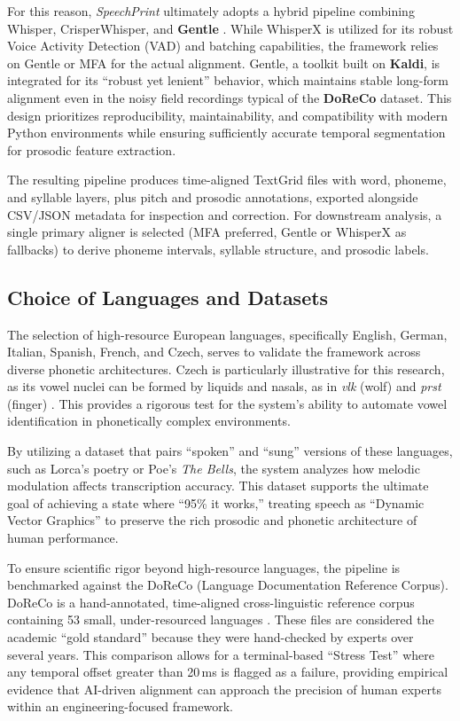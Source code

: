 For this reason, \textit{SpeechPrint} ultimately adopts a hybrid pipeline combining Whisper, CrisperWhisper, and \textbf{Gentle} \cite{ochshorn2015gentle}. While WhisperX is utilized for its robust Voice Activity Detection (VAD) and batching capabilities, the framework relies on Gentle or MFA for the actual alignment. Gentle, a toolkit built on \textbf{Kaldi}, is integrated for its ``robust yet lenient'' behavior, which maintains stable long-form alignment even in the noisy field recordings typical of the \textbf{DoReCo} dataset. This design prioritizes reproducibility, maintainability, and compatibility with modern Python environments while ensuring sufficiently accurate temporal segmentation for prosodic feature extraction.

The resulting pipeline produces time-aligned TextGrid files with word, phoneme, and syllable layers, plus pitch and prosodic annotations, exported alongside CSV/JSON metadata for inspection and correction. For downstream analysis, a single primary aligner is selected (MFA preferred, Gentle or WhisperX as fallbacks) to derive phoneme intervals, syllable structure, and prosodic labels.

\subsection{Choice of Languages and Datasets}

The selection of high-resource European languages, specifically English, German, Italian, Spanish, French, and Czech, serves to validate the framework across diverse phonetic architectures. Czech is particularly illustrative for this research, as its vowel nuclei can be formed by liquids and nasals, as in \textit{vlk} (wolf) and \textit{prst} (finger) \cite{paschen2020doreco}. This provides a rigorous test for the system's ability to automate vowel identification in phonetically complex environments.

By utilizing a dataset that pairs ``spoken'' and ``sung'' versions of these languages, such as Lorca's poetry or Poe's \textit{The Bells}, the system analyzes how melodic modulation affects transcription accuracy. This dataset supports the ultimate goal of achieving a state where ``95\% it works,'' treating speech as ``Dynamic Vector Graphics'' to preserve the rich prosodic and phonetic architecture of human performance.

To ensure scientific rigor beyond high-resource languages, the pipeline is benchmarked against the DoReCo (Language Documentation Reference Corpus). DoReCo is a hand-annotated, time-aligned cross-linguistic reference corpus containing 53 small, under-resourced languages \cite{paschen2020doreco}. These files are considered the academic ``gold standard'' because they were hand-checked by experts over several years. This comparison allows for a terminal-based ``Stress Test'' where any temporal offset greater than 20\,ms is flagged as a failure, providing empirical evidence that AI-driven alignment can approach the precision of human experts within an engineering-focused framework.

